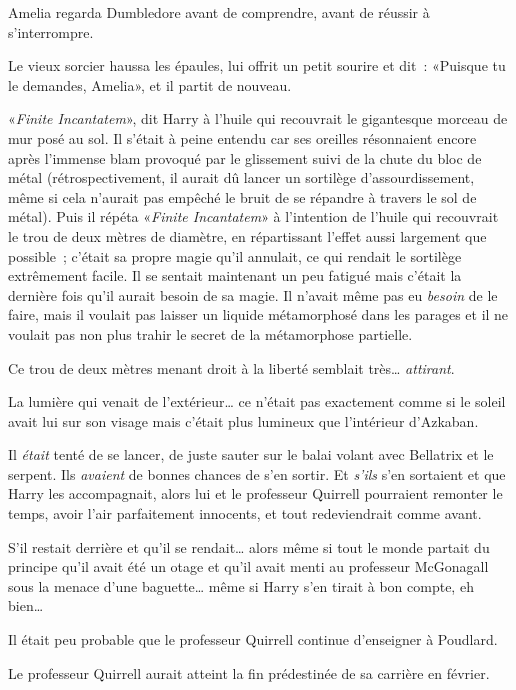 Amelia regarda Dumbledore avant de comprendre, avant de réussir à s'interrompre.

Le vieux sorcier haussa les épaules, lui offrit un petit sourire et dit~: «Puisque tu le demandes, Amelia», et il partit de nouveau.

\later

«\emph{Finite Incantatem}», dit Harry à l'huile qui recouvrait le gigantesque morceau de mur posé au sol. Il s'était à peine entendu car ses oreilles résonnaient encore après l'immense blam provoqué par le glissement suivi de la chute du bloc de métal (rétrospectivement, il aurait dû lancer un sortilège d'assourdissement, même si cela n'aurait pas empêché le bruit de se répandre à travers le sol de métal). Puis il répéta «\emph{Finite Incantatem}» à l'intention de l'huile qui recouvrait le trou de deux mètres de diamètre, en répartissant l'effet aussi largement que possible~; c'était sa propre magie qu'il annulait, ce qui rendait le sortilège extrêmement facile. Il se sentait maintenant un peu fatigué mais c'était la dernière fois qu'il aurait besoin de sa magie. Il n'avait même pas eu \emph{besoin} de le faire, mais il voulait pas laisser un liquide métamorphosé dans les parages et il ne voulait pas non plus trahir le secret de la métamorphose partielle.

Ce trou de deux mètres menant droit à la liberté semblait très… \emph{attirant}.

La lumière qui venait de l'extérieur… ce n'était pas exactement comme si le soleil avait lui sur son visage mais c'était plus lumineux que l'intérieur d'Azkaban.

Il \emph{était} tenté de se lancer, de juste sauter sur le balai volant avec Bellatrix et le serpent. Ils \emph{avaient} de bonnes chances de s'en sortir. Et \emph{s'ils} s'en sortaient et que Harry les accompagnait, alors lui et le professeur Quirrell pourraient remonter le temps, avoir l'air parfaitement innocents, et tout redeviendrait comme avant.

S'il restait derrière et qu'il se rendait… alors même si tout le monde partait du principe qu'il avait été un otage et qu'il avait menti au professeur McGonagall sous la menace d'une baguette… même si Harry s'en tirait à bon compte, eh bien…

Il était peu probable que le professeur Quirrell continue d'enseigner à Poudlard.

Le professeur Quirrell aurait atteint la fin prédestinée de sa carrière en février.

